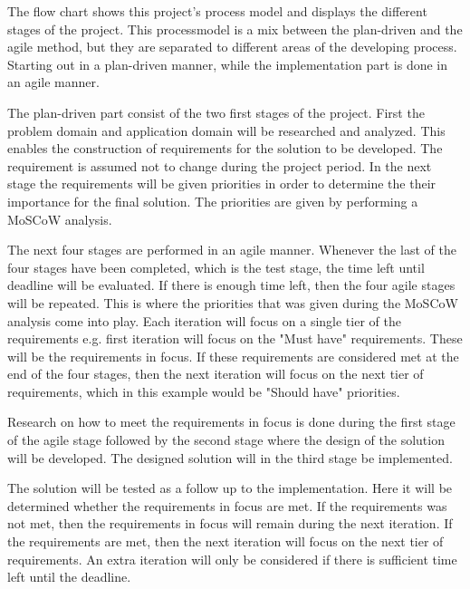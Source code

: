 The  flow chart shows this project's process model and displays the different stages of the project. This processmodel is a mix between the plan-driven and the agile method, but they are separated to different areas of the developing process. Starting out in a plan-driven manner, while the implementation part is done in an agile manner.

The plan-driven part consist of the two first stages of the project. First the problem domain and application domain will be researched and analyzed. This enables the construction of requirements for the solution to be developed. The requirement is assumed not to change during the project period. In the next stage the requirements will be given priorities in order to determine the their importance for the final solution. The priorities are given by performing a MoSCoW analysis.

The next four stages are performed in an agile manner. Whenever the last of the four stages have been completed, which is the test stage, the time left until deadline will be evaluated. If there is enough time left, then the four agile stages will be repeated. This is where the priorities that was given during the MoSCoW analysis come into play. Each iteration will focus on a single tier of the requirements e.g. first iteration will focus on the "Must have" requirements. These will be the requirements in focus. If these requirements are considered met at the end of the four stages, then the next iteration will focus on the next tier of requirements, which in this example would be "Should have" priorities.

Research on how to meet the requirements in focus is done during the first stage of the agile stage followed by the second stage where the design of the solution will be developed. The designed solution will in the third stage be implemented.

The solution will be tested as a follow up to the implementation. Here it will be determined whether the requirements in focus are met. If the requirements was not met, then the requirements in focus will remain during the next iteration. If the requirements are met, then the next iteration will focus on the next tier of requirements. An extra iteration will only be considered if there is sufficient time left until the deadline.

